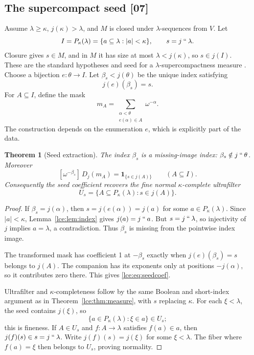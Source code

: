 \documentclass[11pt,letterpaper]{article}
\numberwithin{equation}{section}
\newtheorem{theorem}{Theorem}[section]
\theoremstyle{definition}
\theoremstyle{remark}
\newcommand{\imset}[2]{#1\mathbin{``}#2}
\newcommand{\coef}[2]{[\omega^{#1}]\,#2}
\newcommand{\abs}[1]{\lvert#1\rvert}
\newcommand{\thref}[1]{Theorem~\ref{#1}}
\newcommand{\leref}[1]{Lemma~\ref{#1}}
\newcommand{\src}[1]{\textup{\textsf{\small[#1]}}}%
\begin{document}
\subsection{The supercompact seed \src{07}}
Assume $\lambda\ge\kappa$, $j(\kappa)>\lambda$, and $M$ is closed under
$\lambda$-sequences from $V$. Let
\[
 I=P_\kappa(\lambda)=\{a\subseteq\lambda:\abs a<\kappa\},\qquad
 s=\imset j\lambda.
\]
Closure gives $s\in M$, and in $M$ it has size at most $\lambda<j(\kappa)$,
so $s\in j(I)$. These are the standard hypotheses and seed for a
$\lambda$-supercompactness measure \cite{Neeman}.
Choose a bijection $e:\theta\to I$. Let $\beta_s<j(\theta)$ be the
unique index satisfying
\begin{equation}\label{lce:eq:seedindex}
 j(e)(\beta_s)=s.
\end{equation}
For $A\subseteq I$, define the mask
\[
 m_A=\sum_{\substack{\alpha<\theta\\e(\alpha)\in A}}\omega^{-\alpha}.
\]
The construction depends on the enumeration $e$, which is explicitly part
of the data.

\begin{theorem}[Seed extraction]\label{lce:thm:supercompact}
The index $\beta_s$ is a missing-image index:
$\beta_s\notin\imset j\theta$. Moreover
\begin{equation}\label{lce:eq:seedcoef}
 \coef{-\beta_s}{D_j(m_A)}
     =\mathbf 1_{\{s\in j(A)\}}\qquad(A\subseteq I).
\end{equation}
Consequently the seed coefficient recovers the fine normal
$\kappa$-complete ultrafilter
\[
 U_s=\{A\subseteq P_\kappa(\lambda):s\in j(A)\}.
\]
\end{theorem}
\begin{proof}
If $\beta_s=j(\alpha)$, then $s=j(e(\alpha))=j(a)$ for some
$a\in P_\kappa(\lambda)$. Since $\abs a<\kappa$,
\leref{lce:lem:index} gives $j(a)=\imset ja$. But
$s=\imset j\lambda$, so injectivity of $j$ implies $a=\lambda$, a
contradiction. Thus $\beta_s$ is missing from the pointwise index image.

The transformed mask has coefficient 1 at $-\beta_s$ exactly when
$j(e)(\beta_s)=s$ belongs to $j(A)$. The companion has its exponents
only at positions $-j(\alpha)$, so it contributes zero there. This gives
\eqref{lce:eq:seedcoef}.

Ultrafilter and $\kappa$-completeness follow by the same Boolean and
short-index argument as in \thref{lce:thm:measure}, with $s$ replacing
$\kappa$. For each $\xi<\lambda$, the seed contains $j(\xi)$, so
\[
 \{a\in P_\kappa(\lambda):\xi\in a\}\in U_s;
\]
this is fineness. If $A\in U_s$ and $f:A\to\lambda$ satisfies
$f(a)\in a$, then $j(f)(s)\in s=\imset j\lambda$.
Write $j(f)(s)=j(\xi)$ for some $\xi<\lambda$. The fiber where
$f(a)=\xi$ then belongs to $U_s$, proving normality.
\end{proof}
\end{document}
